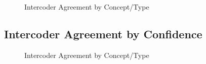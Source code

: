 \documentclass{article}
\begin{document}
\hphantom{em}

\begin{figure}[H]
\caption{Intercoder Agreement by Concept/Type \label{fig:intercoderagreement}}
\end{figure}
\clearpage

\hypertarget{app:agreement_by_confidence}{%
\subsection{Intercoder Agreement by
Confidence}\label{app:agreement_by_confidence}}

\hphantom{em}

\begin{figure}[H]
\caption{Intercoder Agreement by Concept/Type \label{fig:intercoderagreement_confidence}}
\end{figure}
\clearpage
\end{document}
